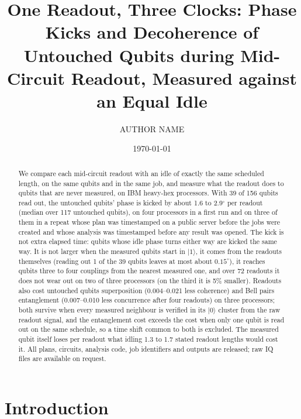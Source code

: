 \documentclass[reprint,amsmath,amssymb,aps,superscriptaddress,nofootinbib]{revtex4-2}
\begin{document}
\title{One Readout, Three Clocks: Phase Kicks and Decoherence of Untouched Qubits during Mid-Circuit Readout, Measured against an Equal Idle}

\author{AUTHOR NAME}

\date{\today}


\begin{abstract}
We compare each mid-circuit readout with an idle of exactly the same scheduled length, on the same qubits and in the same job, and measure what the readout does to qubits that are never measured, on IBM heavy-hex processors. With 39 of 156 qubits read out, the untouched qubits' phase is kicked by about 1.6 to 2.9$^\circ$ per readout (median over 117 untouched qubits), on four processors in a first run and on three of them in a repeat whose plan was timestamped on a public server before the jobs were created and whose analysis was timestamped before any result was opened. The kick is not extra elapsed time: qubits whose idle phase turns either way are kicked the same way. It is not larger when the measured qubits start in $|1\rangle$, it comes from the readouts themselves (reading out 1 of the 39 qubits leaves at most about $0.15^\circ$), it reaches qubits three to four couplings from the nearest measured one, and over 72 readouts it does not wear out on two of three processors (on the third it is 5\% smaller). Readouts also cost untouched qubits superposition (0.004--0.021 less coherence) and Bell pairs entanglement (0.007--0.010 less concurrence after four readouts) on three processors; both survive when every measured neighbour is verified in its $|0\rangle$ cluster from the raw readout signal, and the entanglement cost exceeds the cost when only one qubit is read out on the same schedule, so a time shift common to both is excluded. The measured qubit itself loses per readout what idling 1.3 to 1.7 stated readout lengths would cost it. All plans, circuits, analysis code, job identifiers and outputs are released; raw IQ files are available on request.
\end{abstract}

\maketitle

\section{Introduction}
\end{document}
